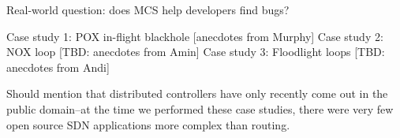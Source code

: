 Real-world question: does MCS help developers find bugs?

\begin{outline}
\1 Case study 1: POX in-flight blackhole [anecdotes from Murphy]
\1 Case study 2: NOX loop [TBD: anecdotes from Amin]
\1 Case study 3: Floodlight loops [TBD: anecdotes from Andi]
\end{outline}

Should mention that distributed controllers have only recently come out in the
public domain--at the time we performed these case studies, there were very
few open source SDN applications more complex than routing.
